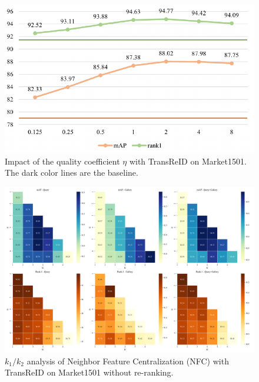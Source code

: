 \begin{figure}
\centering
\includegraphics[width=0.9\linewidth]{figs/pdf/eta.pdf}
\caption{Impact of the quality coefficient \( \eta \) with TransReID on Market1501. The dark color lines are the baseline.}
\label{fig:eta}
\end{figure}

\begin{figure}
\centering
\includegraphics[width=0.9\linewidth]{figs/k1k2.png}
\caption{$k_1/k_2$ analysis of Neighbor Feature Centralization (NFC) with TransReID on Market1501 without re-ranking.}
\label{fig:k1k2}
\end{figure}

